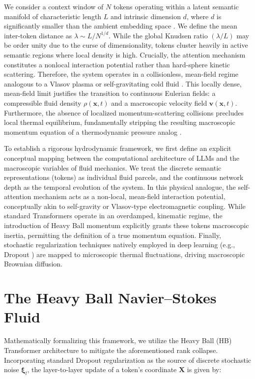 \documentclass[10pt]{article}
\begin{document}
We consider a context window of $N$ tokens operating within a latent semantic manifold of characteristic length $L$ and intrinsic dimension $d$, where $d$ is significantly smaller than the ambient embedding space \cite{ref4}. We define the mean inter-token distance as $\lambda \sim L / N^{1 / d}$. While the global Knudsen ratio $(\lambda / L)$ may be order unity due to the curse of dimensionality, tokens cluster heavily in active semantic regions where local density is high. Crucially, the attention mechanism constitutes a nonlocal interaction potential rather than hard-sphere kinetic scattering. Therefore, the system operates in a collisionless, mean-field regime analogous to a Vlasov plasma or self-gravitating cold fluid \cite{ref5}. This locally dense, mean-field limit justifies the transition to continuous Eulerian fields: a compressible fluid density $\rho(\mathbf{x}, t)$ and a macroscopic velocity field $\mathbf{v}(\mathbf{x}, t)$. Furthermore, the absence of localized momentum-scattering collisions precludes local thermal equilibrium, fundamentally stripping the resulting macroscopic momentum equation of a thermodynamic pressure analog \cite{ref6}.

To establish a rigorous hydrodynamic framework, we first define an explicit conceptual mapping between the computational architecture of LLMs and the macroscopic variables of fluid mechanics. We treat the discrete semantic representations (tokens) as individual fluid parcels, and the continuous network depth as the temporal evolution of the system. In this physical analogue, the self-attention mechanism acts as a non-local, mean-field interaction potential, conceptually akin to self-gravity or Vlasov-type electromagnetic coupling. While standard Transformers operate in an overdamped, kinematic regime, the introduction of Heavy Ball momentum \cite{ref7,ref8} explicitly grants these tokens macroscopic inertia, permitting the definition of a true momentum equation. Finally, stochastic regularization techniques natively employed in deep learning (e.g., Dropout \cite{ref9}) are mapped to microscopic thermal fluctuations, driving macroscopic Brownian diffusion.

\section{The Heavy Ball Navier--Stokes Fluid}

Mathematically formalizing this framework, we utilize the Heavy Ball (HB) Transformer architecture \cite{ref7,ref8} to mitigate the aforementioned rank collapse. Incorporating standard Dropout regularization \cite{ref9} as the source of discrete stochastic noise $\boldsymbol{\xi}_{l}$, the layer-to-layer update of a token's coordinate $\mathbf{X}$ is given by:
\end{document}
